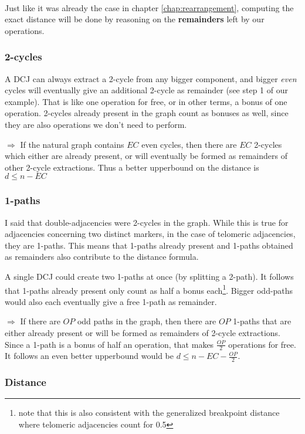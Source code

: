 \documentclass[11pt,final,twoside,nofrench]{thlifl}
\begin{document}
~~

Just like it was already the case in chapter \ref{chap:rearrangement}, computing the exact distance will be done by reasoning on the \textbf{remainders} left by our operations.

\subsubsection*{2-cycles}

A DCJ can always extract a 2-cycle from any bigger component, and bigger \emph{even} cycles will eventually give an additional 2-cycle as remainder (see step 1 of our example). That is like one operation for free, or in other terms, a bonus of one operation. 2-cycles already present in the graph count as bonuses as well, since they are also operations we don't need to perform.

$\Rightarrow$ If the natural graph contains $EC$ even cycles, then there are $EC$ 2-cycles which either are already present, or will eventually be formed as remainders of other 2-cycle extractions. Thus a better upperbound on the distance is $d \leq n - EC$

\subsubsection*{1-paths}

I said that double-adjacencies were 2-cycles in the graph. While this is true for adjacencies concerning two distinct markers, in the case of telomeric adjacencies, they are 1-paths. This means that 1-paths already present and 1-paths obtained as remainders also contribute to the distance formula.

A single DCJ could create two 1-paths at once (by splitting a 2-path). It follows that 1-paths already present only count as half a bonus each\footnote{note that this is also consistent with the generalized breakpoint distance where telomeric adjacencies count for 0.5}. Bigger odd-paths would also each eventually give a free 1-path as remainder.

$\Rightarrow$ If there are $OP$ odd paths in the graph, then there are $OP$ 1-paths that are either already present or will be formed as remainders of 2-cycle extractions. Since a 1-path is a bonus of half an operation, that makes $\frac{OP}{2}$ operations for free. It follows an even better upperbound would be $d \leq n - EC - \frac{OP}{2}$.

\subsubsection*{Distance}
\end{document}
